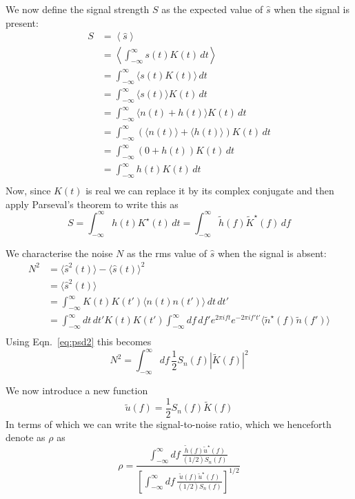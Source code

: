 We now define the signal strength $S$ as the expected value of
$\hat{s}$ when the signal is present:
%
\begin{align*}
S &= \left\langle \hat{s} \right\rangle \\
&= \left\langle  \int_{-\infty}^\infty s(t) K(t)\, dt \right\rangle \\
&= \int_{-\infty}^\infty \langle s(t) K(t)\rangle \, dt \\
&= \int_{-\infty}^\infty \langle s(t) \rangle K(t) \, dt \\
&= \int_{-\infty}^\infty \langle n(t) + h(t) \rangle K(t) \, dt \\
&= \int_{-\infty}^\infty \left( \langle n(t) \rangle + \langle h(t)
\rangle \right)  K(t) \, dt \\
&= \int_{-\infty}^\infty \left( 0 + h(t) \right)  K(t) \, dt \\
&= \int_{-\infty}^\infty h(t) K(t) \, dt \\
\end{align*}
%
Now, since $K(t)$ is real we can replace it by its complex conjugate
and then apply Parseval's theorem to write this as
%
\begin{equation*}
S = \int_{-\infty}^\infty h(t) K^\star(t) \, dt
= \int_{-\infty}^\infty \tilde{h}(f) \tilde{K}^\star(f) \, df
\end{equation*}

We characterise the noise $N$ as the rms value of $\hat{s}$ when the
signal is absent:
%
\begin{align}
N^2 &= \langle \hat{s}^2(t) \rangle - \langle \hat{s}(t) \rangle^2 \\
&= \langle \hat{s}^2(t) \rangle  \\
&= \int_{-\infty}^\infty K(t) K(t') \langle n(t) n(t')
\rangle\,dt\,dt' \\
&= \int_{-\infty}^\infty dt\,dt' K(t) K(t') 
\int_{-\infty}^\infty df\,df' e^{2\pi i f t}e^{-2\pi i f' t'} \langle
\tilde{n}^\star(f) \tilde{n}(f')\rangle \\
\end{align}
%
Using Eqn.~\ref{eq:psd2} this becomes
%
\begin{equation}
N^2 = \int_{-\infty}^\infty df\,\frac{1}{2} S_n(f) |\tilde{K}(f)|^2
\end{equation}

We now introduce a new function
%
\begin{equation}
\tilde{u}(f) = \frac{1}{2} S_n(f) \tilde{K}(f)
\end{equation}
%
In terms of which we can write the signal-to-noise ratio, which we
henceforth denote as $\rho$ as
%
\begin{equation}
\rho =
\frac
  {\int_{-\infty}^\infty df\,
   \frac
     {\tilde{h}(f) \tilde{u}^\star(f)}
     {(1/2) S_n(f)}}
  {\left[\int_{-\infty}^\infty df\,
   \frac
     {\tilde{u}(f) \tilde{u}^\star(f)}
     {(1/2) S_n(f)}\right]^{1/2}}
\end{equation}

